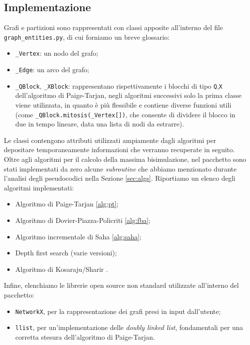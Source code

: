 \subsection{Implementazione}
Grafi e partizioni sono rappresentati con classi apposite all'interno del file \verb|graph_entities.py|, di cui forniamo un breve glossario:
\begin{itemize}
    \item \verb|_Vertex|: un nodo del grafo;
    \item \verb|_Edge|: un arco del grafo;
    \item \verb|_QBlock|, \verb|_XBlock|: rappresentano rispettivamente i blocchi di tipo \verb|Q|,\verb|X| dell'algoritmo di Paige-Tarjan, negli algoritmi successivi solo la prima classe viene utilizzata, in quanto è più flessibile e contiene diverse funzioni utili (come \verb|_QBlock.mitosis(_Vertex[])|, che consente di dividere il blocco in due in tempo lineare, data una lista di nodi da estrarre).
\end{itemize}
Le classi contengono attributi utilizzati ampiamente dagli algoritmi per depositare temporaneamente informazioni che verranno recuperate in seguito. Oltre agli algoritmi per il calcolo della massima bisimulazione, nel pacchetto sono stati implementati da zero alcune \emph{subroutine} che abbiamo menzionato durante l'analisi degli pseudocodici nella Sezione \ref{sec:algs}. Riportiamo un elenco degli algoritmi implementati:
\begin{itemize}
    \item Algoritmo di Paige-Tarjan \ref{alg:pt};
    \item Algoritmo di Dovier-Piazza-Policriti \ref{alg:fba};
    \item Algoritmo incrementale di Saha \ref{alg:saha};
    \item Depth first search (varie versioni);
    \item Algoritmo di Kosaraju/Sharir \cite{sharir}.
\end{itemize}

Infine, elenchiamo le librerie open source non standard utilizzate all'interno del pacchetto:
\begin{itemize}
    \item \texttt{NetworkX}, per la rappresentazione dei grafi presi in input dall'utente;
    \item \texttt{llist}, per un'implementazione delle \emph{doubly linked list}, fondamentali per una corretta stesura dell'algoritmo di Paige-Tarjan.
\end{itemize}
